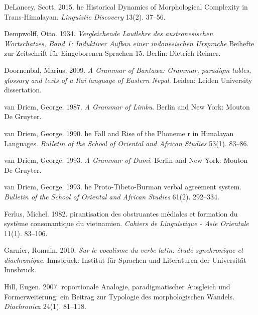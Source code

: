 \documentclass[oneside,a4paper,11pt]{article}
\begin{document}
\begin{thebibliography}{65}
DeLancey, Scott. 2015.
he {H}istorical {D}ynamics of {M}orphological {C}omplexity in
  {T}rans-{H}imalayan.
\newblock \emph{Linguistic Discovery} 13(2). 37--56.

Dempwolff, Otto. 1934.
\newblock \emph{{V}ergleichende {L}autlehre des austronesischen {W}ortschatzes,
  {B}and 1: {I}nduktiver {A}ufbau einer indonesischen {U}rsprache} Beihefte zur
  Zeitschrift für Eingeborenen-Sprachen 15.
\newblock Berlin: Dietrich Reimer.

Doornenbal, Marius. 2009.
\newblock \emph{{A} {G}rammar of {B}antawa: {G}rammar, paradigm tables,
  glossary and texts of a {R}ai language of {E}astern {N}epal}.
\newblock Leiden: Leiden University dissertation.

van Driem, George. 1987.
\newblock \emph{{A} {G}rammar of {L}imbu}.
\newblock Berlin and New York: Mouton De Gruyter.

van Driem, George. 1990.
he {F}all and {R}ise of the {P}honeme r in {H}imalayan
  {L}anguages.
\newblock \emph{Bulletin of the School of Oriental and African Studies} 53(1).
  83--86.

van Driem, George. 1993{}.
\newblock \emph{{A} {G}rammar of {D}umi}.
\newblock Berlin and New York: Mouton De Gruyter.

van Driem, George. 1993{}.
he {P}roto-{T}ibeto-{B}urman verbal agreement system.
\newblock \emph{Bulletin of the School of Oriental and African Studies} 61(2).
  292--334.

Ferlus, Michel. 1982.
pirantisation des obstruantes médiales et formation du système
  consonantique du vietnamien.
\newblock \emph{Cahiers de Linguistique - Asie Orientale} 11(1). 83--106.

Garnier, Romain. 2010.
\newblock \emph{{S}ur le vocalisme du verbe latin: étude synchronique et
  diachronique}.
\newblock Innsbruck: Institut für Sprachen und Literaturen der Universität
  Innsbruck.

Hill, Eugen. 2007.
roportionale {A}nalogie, paradigmatischer {A}usgleich und
  {F}ormerweiterung: ein {B}eitrag zur {T}ypologie des morphologischen
  {W}andels.
\newblock \emph{Diachronica} 24(1). 81–118.


\end{thebibliography}
\end{document}
